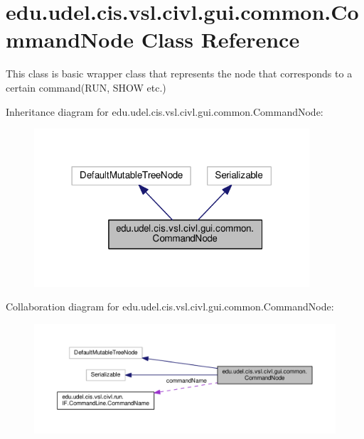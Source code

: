 \hypertarget{classedu_1_1udel_1_1cis_1_1vsl_1_1civl_1_1gui_1_1common_1_1CommandNode}{}\section{edu.\+udel.\+cis.\+vsl.\+civl.\+gui.\+common.\+Command\+Node Class Reference}
\label{classedu_1_1udel_1_1cis_1_1vsl_1_1civl_1_1gui_1_1common_1_1CommandNode}


This class is basic wrapper class that represents the node that corresponds to a certain command(R\+U\+N, S\+H\+O\+W etc.)  




Inheritance diagram for edu.\+udel.\+cis.\+vsl.\+civl.\+gui.\+common.\+Command\+Node\+:
\nopagebreak
\begin{figure}[H]
\begin{center}
\leavevmode
\includegraphics[width=290pt]{classedu_1_1udel_1_1cis_1_1vsl_1_1civl_1_1gui_1_1common_1_1CommandNode__inherit__graph}
\end{center}
\end{figure}


Collaboration diagram for edu.\+udel.\+cis.\+vsl.\+civl.\+gui.\+common.\+Command\+Node\+:
\nopagebreak
\begin{figure}[H]
\begin{center}
\leavevmode
\includegraphics[width=350pt]{classedu_1_1udel_1_1cis_1_1vsl_1_1civl_1_1gui_1_1common_1_1CommandNode__coll__graph}
\end{center}
\end{figure}
